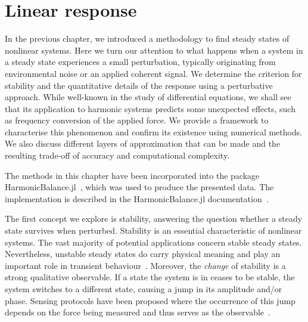 
\newcommand{\bbar}[1]{\bar{\boldsymbol{#1}}}
\newcommand{\bdel}[1]{\boldsymbol{\delta} \vb{#1}}

\chapter{Linear response} \label{ch:linresp}

\begin{chapterabstract}
	In the previous chapter, we introduced a methodology to find steady states of nonlinear systems. Here we turn our attention to what happens when a system in a steady state experiences a small perturbation, typically originating from environmental noise or an applied coherent signal. We determine the criterion for stability and the quantitative details of the response using a perturbative approach. While well-known in the study of differential equations, we shall see that its application to harmonic systems predicts some unexpected effects, such as frequency conversion of the applied force. We provide a framework to characterise this phenomenon and confirm its existence using numerical methods. We also discuss different layers of approximation that can be made and the resulting trade-off of accuracy and computational complexity. 
	
%
\tcblower
%
The methods in this chapter have been incorporated into the package HarmonicBalance.jl~\cite{Kosata_2022a}, which was used to produce the presented data. The implementation is described in the HarmonicBalance.jl documentation~\cite{harmonic_balance_docs}. 
\end{chapterabstract}

The first concept we explore is stability, answering the question whether a steady state survives when perturbed. Stability is an essential characteristic of nonlinear systems. The vast majority of potential applications concern stable steady states. Nevertheless, unstable steady states do carry physical meaning and play an important role in transient behaviour~\cite{Heugel_2022}. Moreover, the \textit{change} of stability is a strong qualitative observable. If a state the system is in ceases to be stable, the system switches to a different state, causing a jump in its amplitude and/or phase. Sensing protocols have been proposed where the occurrence of this jump depends on the force being measured and thus serves as the observable~\cite{Papariello_2016, Leuch_2016}.  

